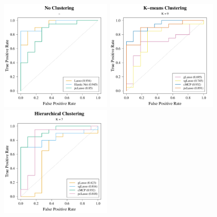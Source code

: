 \documentclass[11pt]{article}
\begin{document}
{\begin{landscape}
\begin{table}[p]
\end{table}

\vspace{0.5cm}

\begin{figure}[p]
    \centering
    \includegraphics[width = 0.475\textwidth]{colon_ROC_no_n.pdf}
    \includegraphics[width = 0.475\textwidth]{colon_ROC_k_n.pdf}
    \includegraphics[width = 0.475\textwidth]{colon_ROC_h_n.pdf}
    \label{colon_ROC}
\end{figure}

\end{landscape}
}

\end{document}
